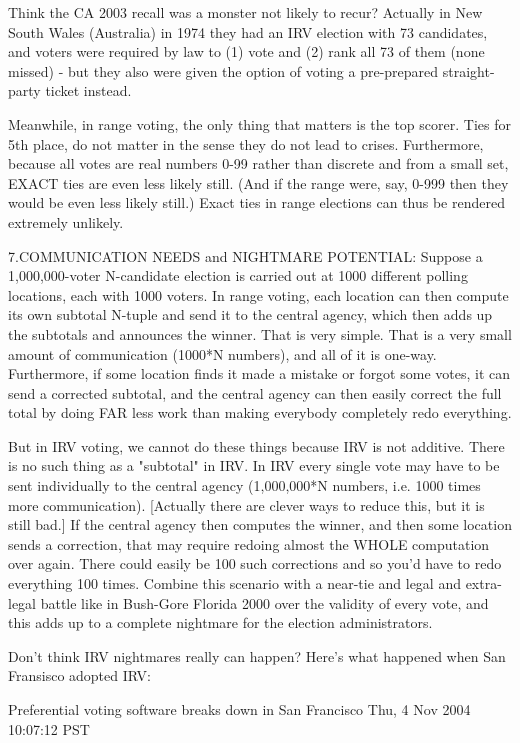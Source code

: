 Think the CA 2003 recall was a monster not likely to recur?  Actually in New South Wales
(Australia) in 1974 they had an IRV election with 73 candidates, and voters were
required by law to (1) vote and (2) rank all 73 of them (none missed) - but they also
were given the option of voting a pre-prepared straight-party ticket instead.

Meanwhile, in range voting, the only thing that matters is the top scorer.
Ties for 5th place, do not matter in the sense they do not lead to crises.  
Furthermore, because all votes are real numbers
0-99 rather than discrete and from a small set, EXACT ties are even less likely still.
(And if the range were, say, 0-999 then they would be even less likely still.)
Exact ties in range elections can thus be rendered extremely unlikely.

7.COMMUNICATION NEEDS and NIGHTMARE POTENTIAL:
Suppose a 1,000,000-voter N-candidate election is carried out at 1000 different 
polling locations, each with 1000 voters.  In range voting, each location can then 
compute its own subtotal N-tuple and send it to the central agency, which then adds up 
the subtotals and announces the winner.  That is very simple.  That is a very small
amount of communication (1000*N numbers), and all of it is one-way.  Furthermore, if
some location finds it made a mistake or forgot some votes,
it can send a corrected subtotal, and the central agency can then easily 
correct the full total by doing FAR less work than making everybody
completely redo everything.  

But in IRV voting, we cannot do these things because IRV is not additive.
There is no such thing as a "subtotal" in IRV.    In IRV every single vote
may have to be sent individually to the central agency (1,000,000*N numbers, 
i.e. 1000 times more communication).  [Actually there are clever ways to reduce this, 
but it is still bad.] If the central agency then
computes the winner, and then some location sends a correction, that may require
redoing almost the WHOLE computation over again.  There could easily be 100 such
corrections and so you'd have to redo everything 100 times.  Combine this
scenario with a near-tie and legal and extra-legal battle like in Bush-Gore
Florida 2000 over the validity of every vote, and this adds up to a complete
nightmare for the election administrators.

Don't think IRV nightmares really can happen?  Here's what happened 
when San Fransisco adopted IRV:

  Preferential voting software breaks down in San Francisco
  Thu, 4 Nov 2004 10:07:12 PST

